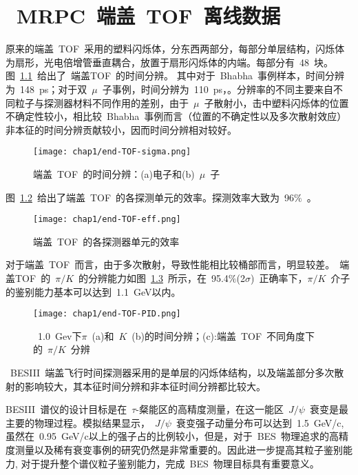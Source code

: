 \chapter{~MRPC~端盖~TOF~离线数据}
原来的端盖~TOF~采用的塑料闪烁体，分东西两部分，每部分单层结构，闪烁体为扇形，光电倍增管垂直耦合，放置于扇形闪烁体的内端。每部分有~48~块。
图~\ref{fig:end-TOF-sigma}~给出了~端盖TOF~的时间分辨。
其中对于~Bhabha~事例样本，时间分辨为~148~ps；对于双~$\mu$~子事例，时间分辨为~110~ps，\cite{zhaoc:2011}。分辨率的不同主要来自不同粒子与探测器材料不同作用的差别，由于~$\mu$~子散射小，击中塑料闪烁体的位置不确定性较小，相比较~Bhabha~事例而言（位置的不确定性以及多次散射效应）非本征的时间分辨贡献较小，因而时间分辨相对较好。
\begin{figure}[!h]
  \centering
  \texttt{[image: chap1/end-TOF-sigma.png]}
  \caption{端盖~TOF~的时间分辨：(a)电子和(b)~$\mu$~子}
  \label{fig:end-TOF-sigma}
\end{figure}
图~\ref{fig:end-TOF-eff}~给出了端盖~TOF~的各探测单元的效率。探测效率大致为~96$\%$~\cite{wangxz2016}。
\begin{figure}[!h]
  \centering
  \texttt{[image: chap1/end-TOF-eff.png]}
  \caption{端盖~TOF~的各探测器单元的效率}
  \label{fig:end-TOF-eff}
\end{figure}

对于端盖~TOF~而言，由于多次散射，导致性能相比较桶部而言，明显较差。~端盖TOF~的~$\pi/K$~的分辨能力如图~\ref{fig:end-TOF-PID}~\cite{zhaoc:2011}所示，在~95.4$\%$(2$\sigma$)~正确率下，$\pi/K$~介子的鉴别能力基本可以达到~1.1~GeV以内。

\begin{figure}[!h]
  \centering
  \texttt{[image: chap1/end-TOF-PID.png]}
  \caption{~1.0~Gev下$\pi$~(a)和~$K$~(b)的时间分辨；(c):端盖~TOF~不同角度下的~$\pi/K$~分辨}
  \label{fig:end-TOF-PID}
\end{figure}

~BESIII~端盖飞行时间探测器采用的是单层的闪烁体结构，以及端盖部分多次散射的影响较大，其本征时间分辨和非本征时间分辨都比较大。

BESIII~谱仪的设计目标是在~$\tau$-粲能区的高精度测量，在这一能区~$J/\psi$~衰变是最主要的物理过程。模拟结果显示，~$J/\psi$~衰变强子动量分布可以达到~1.5~GeV/c,虽然在~0.95~GeV/c以上的强子占的比例较小，但是，对于~BES~物理追求的高精度测量以及稀有衰变事例的研究仍然是非常重要的。因此进一步提高其粒子鉴别能力, 对于提升整个谱仪粒子鉴别能力，完成~BES~物理目标具有重要意义。

